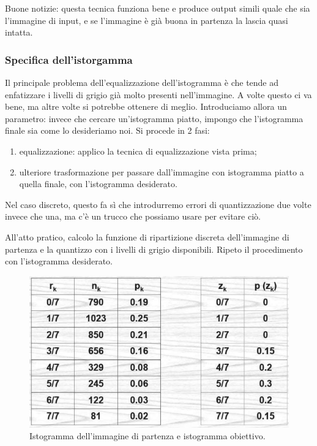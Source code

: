 \documentclass[a4paper,11pt]{article}
\begin{document}
Buone notizie: questa tecnica funziona bene e produce output simili quale che sia l'immagine di input, e se l'immagine è già buona in partenza la lascia quasi intatta.

\subsubsection{Specifica dell'istorgamma}
Il principale problema dell'equalizzazione dell'istogramma è che tende ad enfatizzare i livelli di grigio già molto presenti nell'immagine. A volte questo ci va bene, ma altre volte si potrebbe
ottenere di meglio. Introduciamo allora un parametro: invece che cercare un'istogramma piatto, impongo che l'istogramma finale sia come lo desideriamo noi. Si procede in 2 fasi:
\begin{enumerate}
    \item equalizzazione: applico la tecnica di equalizzazione vista prima;
    \item ulteriore trasformazione per passare dall'immagine con istogramma piatto a quella finale, con l'istogramma desiderato.
\end{enumerate}
Nel caso discreto, questo fa sì che introdurremo errori di quantizzazione due volte invece che una, ma c'è un trucco che possiamo usare per evitare ciò.

\par
All'atto pratico, calcolo la funzione di ripartizione discreta dell'immagine di partenza e la quantizzo con i livelli di grigio disponibili. Ripeto
il procedimento con l'istogramma desiderato.

\renewcommand{\thefigure}{5.19}
\begin{figure}[!h]
  \centering
    \includegraphics[scale=0.4]{images/5/hist_spec_1.png}
    \caption{Istogramma dell'immagine di partenza e istogramma obiettivo.}
\end{figure}
\end{document}
